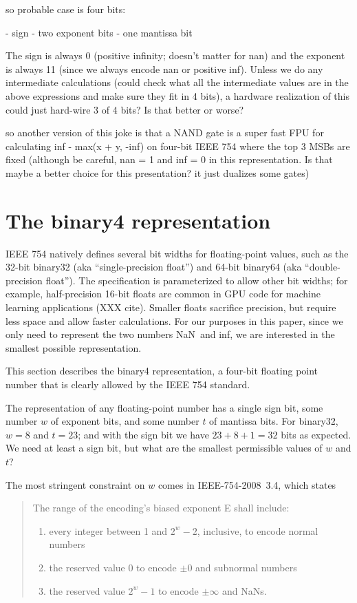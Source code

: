 \documentclass[twocolumn]{article}
\newcommand\nan{\textsf{NaN}}
\renewcommand\inf{\textsf{inf}}
\newcommand\plusminus{\pm}
\begin{document}
{so probable case is four bits:

 - sign
 - two exponent bits
 - one mantissa bit

The sign is always 0 (positive infinity; doesn't matter for nan)
and the exponent is always 11 (since we always encode nan or
positive inf). Unless we do any intermediate calculations
(could check what all the intermediate values are in the above
expressions and make sure they fit in 4 bits), a hardware
realization of this could just hard-wire 3 of 4 bits? Is that
better or worse?

so another version of this joke is that a NAND gate is a super
fast FPU for calculating inf - max(x + y, -inf) on four-bit
IEEE 754 where the top 3 MSBs are fixed (although be careful,
nan = 1 and inf = 0 in this representation. Is that maybe a
better choice for this presentation? it just dualizes some
gates)

}

\section{The binary4 representation}

IEEE 754 natively defines several bit widths for floating-point
values, such as the 32-bit binary32 (aka ``single-precision float'')
and 64-bit binary64 (aka ``double-precision float''). The
specification is parameterized to allow other bit widths; for example,
half-precision 16-bit floats are common in GPU code for machine
learning applications (XXX cite). Smaller floats sacrifice precision,
but require less space and allow faster calculations. For our purposes
in this paper, since we only need to represent the two numbers \nan\ and
\inf, we are interested in the smallest possible representation. 


This section describes the binary4 representation, a four-bit floating
point number that is clearly allowed by the IEEE 754 standard.

The representation of any floating-point number has a single sign bit,
some number $w$ of exponent bits, and some number $t$ of mantissa
bits. For binary32, $w = 8$ and $t = 23$; and with the sign bit we
have $23 + 8 + 1 = 32$ bits as expected. We need at least a sign bit,
but what are the smallest permissible values of $w$ and $t$?

The most stringent constraint on $w$ comes in IEEE-754-2008~3.4, which
states
\begin{quote}
  The range of the encoding's biased exponent E shall include:
  \begin{enumerate}[label=---]
    \item every integer between 1 and $2^w - 2$, inclusive, to encode
      normal numbers
    \item the reserved value 0 to encode $\plusminus 0$ and subnormal
      numbers
    \item the reserved value $2^w - 1$ to encode $\plusminus \infty$
      and NaNs.
  \end{enumerate}
\end{quote}
\end{document}
